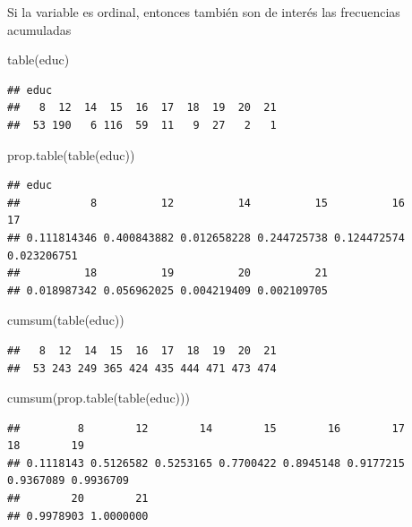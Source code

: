 \documentclass[
]{book}
\newenvironment{Shaded}{\begin{snugshade}}{\end{snugshade}}
\newcommand{\FunctionTok}[1]{\textcolor[rgb]{0.00,0.00,0.00}{#1}}
\newcommand{\NormalTok}[1]{#1}
\theoremstyle{break}
\theoremstyle{nonumberplain}
\begin{document}
Si la variable es ordinal, entonces también son de interés las
frecuencias acumuladas

\begin{Shaded}
\begin{Highlighting}[]
\FunctionTok{table}\NormalTok{(educ)}
\end{Highlighting}
\end{Shaded}

\begin{verbatim}
## educ
##   8  12  14  15  16  17  18  19  20  21 
##  53 190   6 116  59  11   9  27   2   1
\end{verbatim}

\begin{Shaded}
\begin{Highlighting}[]
\FunctionTok{prop.table}\NormalTok{(}\FunctionTok{table}\NormalTok{(educ))}
\end{Highlighting}
\end{Shaded}

\begin{verbatim}
## educ
##           8          12          14          15          16          17 
## 0.111814346 0.400843882 0.012658228 0.244725738 0.124472574 0.023206751 
##          18          19          20          21 
## 0.018987342 0.056962025 0.004219409 0.002109705
\end{verbatim}

\begin{Shaded}
\begin{Highlighting}[]
\FunctionTok{cumsum}\NormalTok{(}\FunctionTok{table}\NormalTok{(educ))}
\end{Highlighting}
\end{Shaded}

\begin{verbatim}
##   8  12  14  15  16  17  18  19  20  21 
##  53 243 249 365 424 435 444 471 473 474
\end{verbatim}

\begin{Shaded}
\begin{Highlighting}[]
\FunctionTok{cumsum}\NormalTok{(}\FunctionTok{prop.table}\NormalTok{(}\FunctionTok{table}\NormalTok{(educ)))}
\end{Highlighting}
\end{Shaded}

\begin{verbatim}
##         8        12        14        15        16        17        18        19 
## 0.1118143 0.5126582 0.5253165 0.7700422 0.8945148 0.9177215 0.9367089 0.9936709 
##        20        21 
## 0.9978903 1.0000000
\end{verbatim}
\end{document}
